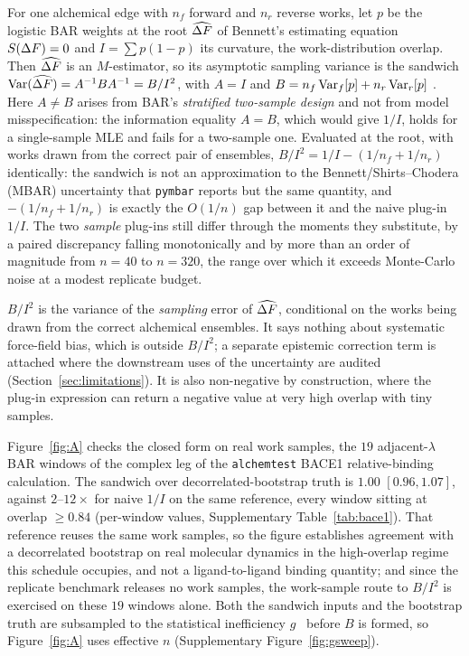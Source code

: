 \begin{theorem}\label{thm:sand}
For one alchemical edge with $n_f$ forward and $n_r$ reverse works, let $p$ be the logistic BAR
weights at the root $\widehat{\Delta F}$ of Bennett's estimating equation $S(\Delta F)=0$ and $I=\sum p(1-p)$ its
curvature, the work-distribution overlap. Then $\widehat{\Delta F}$ is an $M$-estimator, so its asymptotic
sampling variance is the sandwich $\operatorname{Var}(\widehat{\Delta F})=A^{-1}BA^{-1}=B/I^2$, with $A=I$ and
$B=n_f\operatorname{Var}_f[p]+n_r\operatorname{Var}_r[p]$ \citep{huber1967}. Here $A\neq B$ arises from BAR's
\emph{stratified two-sample design} and not from model misspecification: the information
equality $A=B$, which would give $1/I$, holds for a single-sample MLE and fails for a two-sample
one. Evaluated at the root, with works drawn from the
correct pair of ensembles, $B/I^2=1/I-(1/n_f+1/n_r)$ identically: the sandwich is not an
approximation to the Bennett/Shirts--Chodera (MBAR) uncertainty
\citep{bennett1976bar,shirts2008mbar} that \texttt{pymbar} reports but the same quantity, and
$-(1/n_f+1/n_r)$ is exactly the $O(1/n)$ gap between it and the naive plug-in $1/I$. The two
\emph{sample} plug-ins still differ through the moments they substitute, by a paired discrepancy
falling monotonically and by more than an order of magnitude from $n{=}40$ to $n{=}320$, the range
over which it exceeds Monte-Carlo noise at a modest replicate budget.
\end{theorem}

\begin{remark}
$B/I^2$ is the variance of the \emph{sampling} error of $\widehat{\Delta F}$, conditional on the works being
drawn from the correct alchemical ensembles. It says nothing about systematic force-field bias,
which is outside $B/I^2$; a separate epistemic correction term is attached where the downstream
uses of the uncertainty are audited (Section~\ref{sec:limitations}). It is also non-negative by
construction, where the plug-in expression can return a negative value at very high overlap with
tiny samples.
\end{remark}

Figure~\ref{fig:A} checks the closed form on real work samples, the $19$ adjacent-$\lambda$ BAR
windows of the complex leg of the \texttt{alchemtest} BACE1 relative-binding calculation. The
sandwich over decorrelated-bootstrap truth is $1.00$ $[0.96,1.07]$, against $2$--$12\times$ for
naive $1/I$ on the same reference, every window sitting at overlap $\geq0.84$ (per-window values,
Supplementary Table~\ref{tab:bace1}). That reference reuses the same work samples, so the figure
establishes agreement with a decorrelated bootstrap on real molecular dynamics in the high-overlap
regime this schedule occupies, and not a ligand-to-ligand binding quantity; and since the
replicate benchmark releases no work samples, the work-sample route to $B/I^2$ is exercised on
these $19$ windows alone. Both the sandwich inputs and the bootstrap truth are subsampled to the
statistical inefficiency $g$~\citep{shirts2008mbar} before $B$ is formed, so Figure~\ref{fig:A}
uses effective $n$ (Supplementary Figure~\ref{fig:gsweep}).

